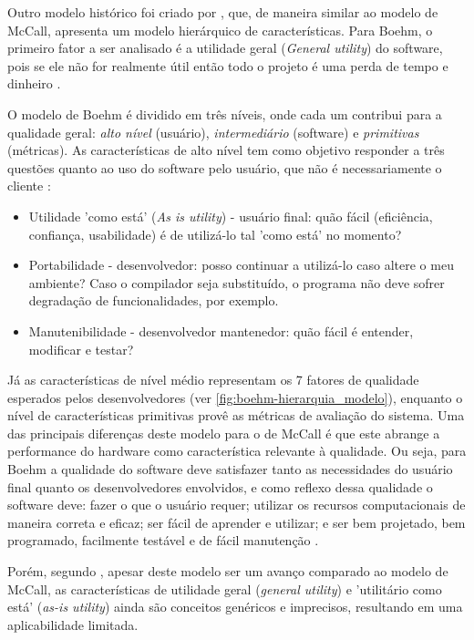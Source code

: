 \documentclass[
	12pt,				%
	openright,			%
	oneside,			%
	a4paper,			%
	english,			%
	brazil,				%
	]{abntex2}
\begin{document}
Outro modelo histórico foi criado por , que, de maneira similar ao modelo de McCall, apresenta um modelo hierárquico de características. Para Boehm, o primeiro fator a ser analisado é a utilidade geral (\emph{General utility}) do software, pois se ele não for realmente útil então todo o projeto é uma perda de tempo e dinheiro \cite{PFLEEGER2010}.

O modelo de Boehm é dividido em três níveis, onde cada um contribui para a qualidade geral: \emph{alto nível} (usuário), \emph{intermediário} (software) e \emph{primitivas} (métricas). As características de alto nível tem como objetivo responder a três questões quanto ao uso do software pelo usuário, que não é necessariamente o cliente \cite{berander2005}:

\begin{itemize}
    \item Utilidade 'como está' (\emph{As is utility}) - usuário final: quão fácil (eficiência, confiança, usabilidade) é de utilizá-lo tal 'como está' no momento?
    \item Portabilidade - desenvolvedor: posso continuar a utilizá-lo caso altere o meu ambiente? Caso o compilador seja substituído, o programa não deve sofrer degradação de funcionalidades, por exemplo.
    \item Manutenibilidade - desenvolvedor mantenedor: quão fácil é entender, modificar e testar?
\end{itemize}

Já as características de nível médio representam os 7 fatores de qualidade esperados pelos desenvolvedores (ver \autoref{fig:boehm-hierarquia_modelo}), enquanto o nível de características primitivas provê as métricas de avaliação do sistema. Uma das principais diferenças deste modelo para o de McCall é que este abrange a performance do hardware como característica relevante à qualidade. Ou seja, para Boehm a qualidade do software deve satisfazer tanto as necessidades do usuário final quanto os desenvolvedores envolvidos, e como reflexo dessa qualidade o software deve: fazer o que o usuário requer; utilizar os recursos computacionais de maneira correta e eficaz; ser fácil de aprender e utilizar; e ser bem projetado, bem programado, facilmente testável e de fácil manutenção \cite{PFLEEGER2010}.

Porém, segundo , apesar deste modelo ser um avanço comparado ao modelo de McCall, as características de utilidade geral (\emph{general utility}) e 'utilitário como está' (\emph{as-is utility}) ainda são conceitos genéricos e imprecisos, resultando em uma aplicabilidade limitada.
\end{document}
